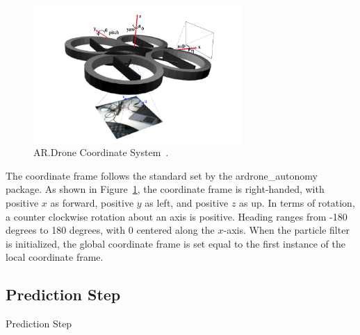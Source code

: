 			\begin{figure}
			\centering
				\includegraphics[width=300px]{../images/coordinates.png}
				\caption{AR.Drone Coordinate System~\cite{ARDroneEducation}.}\label{fig:coords}
			\end{figure}

			The coordinate frame follows the standard set by the ardrone\_autonomy package. As shown in Figure~\ref{fig:coords}, the coordinate frame is right-handed, with positive $x$ as forward, positive $y$ as left, and positive $z$ as up. In terms of rotation, a counter clockwise rotation about an axis is positive. Heading ranges from -180 degrees to 180 degrees, with 0 centered along the $x$-axis. When the particle filter is initialized, the global coordinate frame is set equal to the first instance of the local coordinate frame.


	\subsection{Prediction Step}

		\begin{algorithm}
			\centering
			\caption{Prediction Step} 
			\begin{algorithmic}[1]
						 \label{predict:line:theta}
						 \label{predict:line:transform}
						 \label{predict:line:position}
					\EndFor
				\EndFunction
			\end{algorithmic}
		\end{algorithm}

